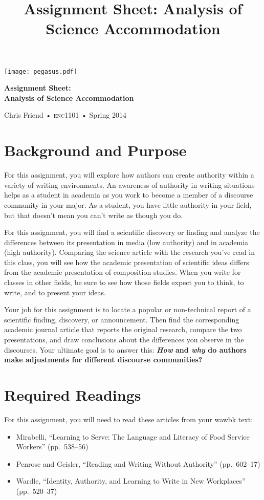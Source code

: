 \documentclass[11pt, oneside]{amsart}	%
\title[Science Accommodation]{Assignment Sheet: Analysis of Science Accommodation}
\begin{document}
%
\thispagestyle{empty}
\vspace{-2in}
\begin{center}
\huge
\texttt{[image: pegasus.pdf]}

\textbf{Assignment Sheet:\\ Analysis of Science Accommodation}

{\normalsize Chris Friend • \textsc{enc1101} • Spring 2014}
\end{center}
\vspace{1.5\baselineskip}

\section{Background and Purpose} %
\label{sec:background}
For this assignment, you will explore how authors can create authority within a variety of writing environments. An awareness of authority in writing situations helps as a student in academia as you work to become a member of a discourse community in your major. As a student, you have little authority in your field, but that doesn't mean you can't write as though you do.

For this assignment, you will find a scientific discovery or finding and analyze the differences between its presentation in media (low authority) and in academia (high authority). Comparing the science article with the research you've read in this class, you will see how the academic presentation of scientific ideas differs from the academic presentation of composition studies. When you write for classes in other fields, be sure to see how those fields expect you to think, to write, and to present your ideas.

Your job for this assignment is to locate a popular or non-technical report of a scientific finding, discovery, or announcement. Then find the corresponding academic journal article that reports the original research, compare the two presentations, and draw conclusions about the differences you observe in the discourses. Your ultimate goal is to answer this: \textbf{\emph{How} and \emph{why} do authors make adjustments for different discourse communities?}


\section{Required Readings} %
\label{sec:readings}
For this assignment, you will need to read these articles from your \ac{wawbk} text:
\begin{itemize}
	\item Mirabelli, ``Learning to Serve: The Language and Literacy of Food Service Workers'' (pp.\ 538--56)
	\item Penrose and Geisler, ``Reading and Writing Without Authority'' (pp.\ 602--17)
	\item Wardle, ``Identity, Authority, and Learning to Write in New Workplaces'' (pp.\ 520--37)
\end{itemize}
\end{document}
